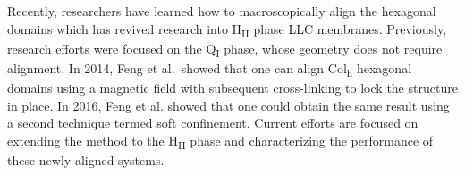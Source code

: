 \documentclass[journal=jpcbfk,manusciprt=article]{achemso}
\begin{document}


  Recently, researchers have learned how to macroscopically align the hexagonal
  domains which has revived research into H\textsubscript{II} phase LLC membranes.
  Previously, research efforts were focused on the Q\textsubscript{I} phase,
  whose geometry does not require alignment. In 2014, Feng et al.~showed that one
  can align Col\textsubscript{h} hexagonal domains using a magnetic field with
  subsequent cross-linking to lock the structure in place\cite{feng_scalable_2014}.
  In 2016, Feng et al. showed that one could obtain the same result using a second
  technique termed soft confinement\cite{feng_thin_2016}. Current efforts are focused
  on extending the method to the H\textsubscript{II} phase and characterizing the 
  performance of these newly aligned systems.
\end{document}

